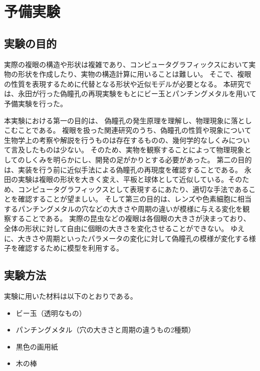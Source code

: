 \chapter{予備実験}
\label{CExperiment}

\section{実験の目的}
\label{SExperimentPurpose}


実際の複眼の構造や形状は複雑であり、コンピュータグラフィックスにおいて実物の形状を作成したり、実物の構造計算に用いることは難しい。
そこで、複眼の性質を表現するために代替となる形状や近似モデルが必要となる。
本研究では、永田\cite{永田敏夫:2008-03-10}が行った偽瞳孔の再現実験をもとにビー玉とパンチングメタルを用いて予備実験を行った。

本実験における第一の目的は、 偽瞳孔の発生原理を理解し、物理現象に落としこむことである。
複眼を扱った関連研究のうち、偽瞳孔の性質や現象について生物学上の考察や解説を行うものは存在するものの、幾何学的なしくみについて言及したものは少ない。
そのため、実物を観察することによって物理現象としてのしくみを明らかにし、開発の足がかりとする必要があった。
第二の目的は、実装を行う前に近似手法による偽瞳孔の再現度を確認することである。
永田の実験は複眼の形状を大きく変え、平板と球体として近似している。そのため、コンピュータグラフィックスとして表現するにあたり、適切な手法であることを確認することが望ましい。
そして第三の目的は、レンズや色素細胞に相当するパンチングメタルの穴などの大きさや周期の違いが模様に与える変化を観察することである。
実際の昆虫などの複眼は各個眼の大きさが決まっており、全体の形状に対して自由に個眼の大きさを変化させることができない。
ゆえに、大きさや周期といったパラメータの変化に対して偽瞳孔の模様が変化する様子を確認するために模型を利用する。

\section{実験方法}
\label{SExperimentMethod}

実験に用いた材料は以下のとおりである。

\begin{itemize}
\item ビー玉（透明なもの）
\item パンチングメタル（穴の大きさと周期の違うもの2種類）
\item 黒色の画用紙
\item 木の棒
\end{itemize}

